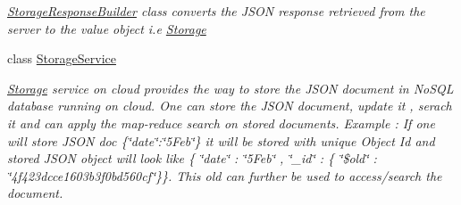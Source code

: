 \begin{DoxyCompactItemize}
\begin{DoxyCompactList}\small\item\em \hyperlink{classcom_1_1shephertz_1_1app42_1_1paas_1_1sdk_1_1csharp_1_1storage_1_1_storage_response_builder}{Storage\+Response\+Builder} class converts the J\+S\+O\+N response retrieved from the server to the value object i.\+e \hyperlink{classcom_1_1shephertz_1_1app42_1_1paas_1_1sdk_1_1csharp_1_1storage_1_1_storage}{Storage} \end{DoxyCompactList}\item 
class \hyperlink{classcom_1_1shephertz_1_1app42_1_1paas_1_1sdk_1_1csharp_1_1storage_1_1_storage_service}{Storage\+Service}
\begin{DoxyCompactList}\small\item\em \hyperlink{classcom_1_1shephertz_1_1app42_1_1paas_1_1sdk_1_1csharp_1_1storage_1_1_storage}{Storage} service on cloud provides the way to store the J\+S\+O\+N document in No\+S\+Q\+L database running on cloud. One can store the J\+S\+O\+N document, update it , serach it and can apply the map-\/reduce search on stored documents. Example \+: If one will store J\+S\+O\+N doc \{\char`\"{}date\char`\"{}\+:\char`\"{}5\+Feb\char`\"{}\} it will be stored with unique Object Id and stored J\+S\+O\+N object will look like \{ \char`\"{}date\char`\"{} \+: \char`\"{}5\+Feb\char`\"{} , \char`\"{}\+\_\+id\char`\"{} \+: \{ \char`\"{}\$old\char`\"{} \+: \char`\"{}4f423dcce1603b3f0bd560cf\char`\"{}\}\}. This old can further be used to access/search the document. \end{DoxyCompactList}\end{DoxyCompactItemize}
